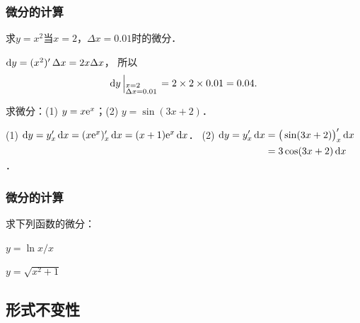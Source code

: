 \documentclass[14pt,notheorems,leqno,xcolor={rgb}]{beamer} %
\begin{document}
\begin{frame}
\frametitle{微分的计算}
\begin{example}
求$y=x^2$当$x=2$，$\Delta x=0.01$时的微分．
\end{example}
\pause
\begin{solution}
$\mathop{}\!\mathrm{d} y = (x^2)'\,\Delta x=2x\Delta x$，\pause
所以$$\mathop{}\!\mathrm{d} y\left|_{\begin{subarray}{l}x=2\\\Delta x=0.01\end{subarray}}\right.
=2\times 2 \times 0.01 = 0.04.$$
\end{solution}
\vpause
\begin{example}
求微分：(1) $y=x\mathrm{e}^x$；(2) $y=\sin(3x+2)$．
\end{example}
\unskip\pause
\begin{solution}
(1) $\mathop{}\!\mathrm{d} y=y'_x\mathop{}\!\mathrm{d} x = (x\mathrm{e}^x)'_x\mathop{}\!\mathrm{d} x = (x+1)\mathrm{e}^x\mathop{}\!\mathrm{d} x$．\ppause
(2) $\begin{aligned}[t]\mathop{}\!\mathrm{d} y=y'_x\mathop{}\!\mathrm{d} x &= \big(\sin(3x+2)\big)'_x\mathop{}\!\mathrm{d} x \\&= 3\cos(3x+2)\mathop{}\!\mathrm{d} x\end{aligned}$．
\end{solution}
\end{frame}

\begin{oframe}
\frametitle{微分的计算}
\begin{exercise}
求下列函数的微分：
\begin{enumhalf}
  \item $y=\ln x/x$ ~
  \item $y=\sqrt{x^2+1}$ ~
\end{enumhalf}
\end{exercise}
\end{oframe}

\subsection{形式不变性}
\end{document}
